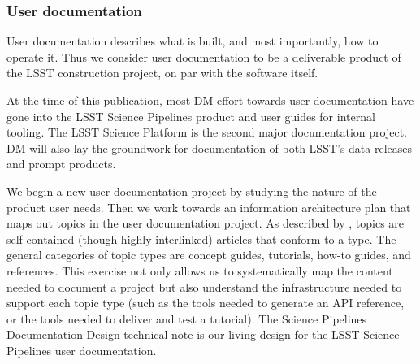 \subsubsection{User documentation}
\label{sec:user_docs}

User documentation describes what is built, and most importantly, how to operate it.
Thus we consider user documentation to be a deliverable product of the LSST construction project, on par with the software itself.

At the time of this publication, most DM effort towards user documentation have gone into the LSST Science Pipelines product\cite{pipelines-guide} and user guides for internal tooling.
The LSST Science Platform is the second major documentation project.
DM will also lay the groundwork for documentation of both LSST's data releases and prompt products.

We begin a new user documentation project by studying the nature of the product user needs.
Then we work towards an information architecture plan that maps out topics in the user documentation project.
As described by , topics are self-contained (though highly interlinked) articles that conform to a type.
The general categories of topic types are concept guides, tutorials, how-to guides, and references.\cite{Procida:2017}
This exercise not only allows us to systematically map the content needed to document a project but also understand the infrastructure needed to support each topic type (such as the tools needed to generate an API reference, or the tools needed to deliver and test a tutorial).
The Science Pipelines Documentation Design\cite{DMTN-030} technical note is our living design for the LSST Science Pipelines user documentation.
